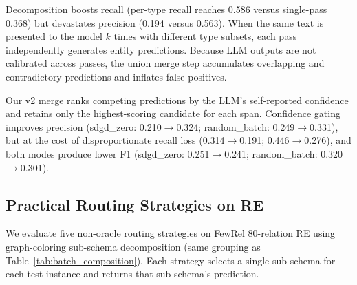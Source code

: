 \documentclass[11pt]{article}
\begin{document}
\begin{table}[h]
\centering
\small
\caption{Few-NERD extraction under decomposition modes. V1 uses union merge; v2 uses confidence-gated merge with \texttt{min\_batch\_size=8} (reducing 8$\to$4 batches for sdgd\_zero). All decomposition modes produce lower F1 than the single-pass baseline. All modes use the v1 prompt.}
\label{tab:sdgd_results}
\end{table}

Decomposition boosts recall (per-type recall reaches 0.586 versus single-pass 0.368) but devastates precision (0.194 versus 0.563). When the same text is presented to the model $k$ times with different type subsets, each pass independently generates entity predictions. Because LLM outputs are not calibrated across passes, the union merge step accumulates overlapping and contradictory predictions and inflates false positives.

Our v2 merge ranks competing predictions by the LLM's self-reported confidence and retains only the highest-scoring candidate for each span. Confidence gating improves precision (sdgd\_zero: 0.210$\to$0.324; random\_batch: 0.249$\to$0.331), but at the cost of disproportionate recall loss (0.314$\to$0.191; 0.446$\to$0.276), and both modes produce lower F1 (sdgd\_zero: 0.251$\to$0.241; random\_batch: 0.320$\to$0.301).

\subsection{Practical Routing Strategies on RE}
\label{sec:appendix_routing}

We evaluate five non-oracle routing strategies on FewRel 80-relation RE using graph-coloring sub-schema decomposition (same grouping as Table~\ref{tab:batch_composition}). Each strategy selects a single sub-schema for each test instance and returns that sub-schema's prediction.
\end{document}
